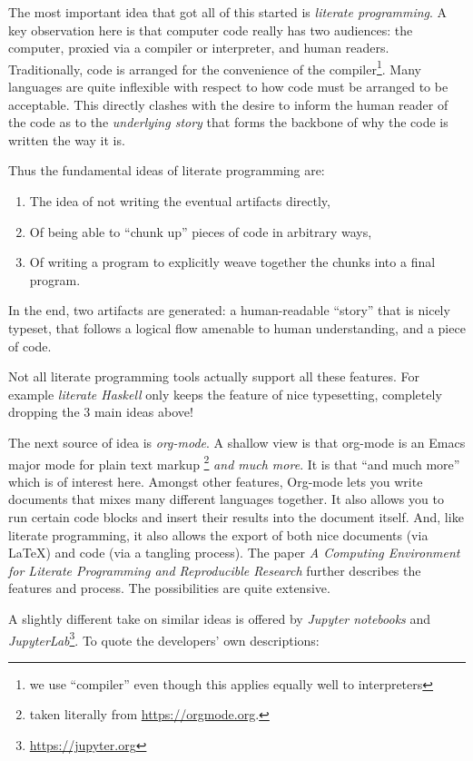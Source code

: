 \documentclass[10pt,twoside,onecolumn,openany,letterpaper]{memoir}
\begin{document}
The most important idea that got all of this started is
\emph{literate programming}\cite{Knuth1984}. A key observation here
is that computer code really has two audiences: the computer, proxied
via a compiler or interpreter, and human readers. Traditionally, code
is arranged for the convenience of the compiler\footnote{we use ``compiler''
even though this applies equally well to interpreters}. Many languages
are quite inflexible with respect to how code must be arranged to be
acceptable. This directly clashes with the desire to inform the
human reader of the code as to the \emph{underlying story} that forms the
backbone of why the code is written the way it is.

Thus the fundamental ideas of literate programming are:
\begin{enumerate}
\item The idea of not writing the eventual artifacts directly,
\item Of being able to ``chunk up'' pieces of code in arbitrary
ways,
\item Of writing a program to explicitly weave together the chunks
into a final program.
\end{enumerate}
In the end, two artifacts are generated: a human-readable ``story'' that
is nicely typeset, that follows a logical flow amenable to human understanding,
and a piece of code.

Not all literate programming tools actually support all these features.
For example \emph{literate Haskell} only keeps the feature of nice typesetting,
completely dropping the $3$ main ideas above!

The next source of idea is \emph{org-mode}\cite{org-mode}. A shallow view
is that org-mode is an Emacs major mode for plain text markup%
\footnote{taken literally from \url{https://orgmode.org}.}
\emph{and much more}.  It is that ``and much more'' which is of interest
here. Amongst other features, Org-mode lets you write documents that mixes many
different languages together. It also allows you to run certain code blocks
and insert their results into the document itself. And, like literate
programming, it also allows the export of both nice documents
(via \LaTeX) and code (via a tangling process). The paper
\textit{A Computing Environment for Literate Programming and
Reproducible Research}\cite{SchulteEtAl2012} further describes the features
and process. The possibilities are quite extensive.

A slightly different take on similar ideas is offered by
\emph{Jupyter notebooks} and 
\emph{JupyterLab}\footnote{\url{https://jupyter.org}}. To quote the
developers' own descriptions:
\end{document}
